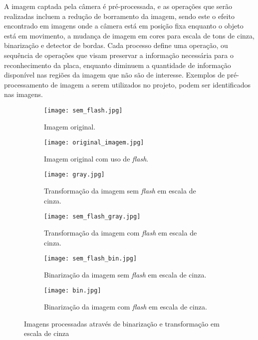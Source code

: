 A imagem captada pela câmera é pré-processada, e as operações que serão realizadas incluem a redução de borramento da imagem, sendo este o efeito encontrado em imagens onde a câmera está em posição fixa enquanto o objeto está em movimento, a mudança de imagem em cores para escala de tons de cinza, binarização e detector de bordas. Cada processo define uma operação, ou sequência de operações que visam preservar a informação necessária para o reconhecimento da placa, enquanto diminuem a quantidade de informação disponível nas regiões da imagem que não são de interesse.
Exemplos de pré-processamento de imagem a serem utilizados no projeto, podem ser identificados nas imagens.

\begin{figure}
    \centering
     \begin{subfigure}{0.45\textwidth}
        \texttt{[image: sem\_flash.jpg]}
        \caption{Imagem original.}
          \label{imagens_processadas:a}
      \end{subfigure}
        \hfill
      \begin{subfigure}{0.45\textwidth}
        \texttt{[image: original\_imagem.jpg]}
        \caption{Imagem original com uso de \emph{flash}.}
          \label{imagens_processadas:b}
      \end{subfigure}
      \hfill
      \begin{subfigure}{0.45\textwidth}
        \texttt{[image: gray.jpg]}
        \caption{Transformação da imagem sem \emph{flash} em escala de cinza.}
          \label{imagens_processadas:c}
      \end{subfigure}
      \hfill
      \begin{subfigure}{0.45\textwidth}
        \texttt{[image: sem\_flash\_gray.jpg]}
        \caption{Transformação da imagem com \emph{flash} em escala de cinza.}
          \label{imagens_processadas:d}
      \end{subfigure}
      \hfill
      \begin{subfigure}{0.45\textwidth}
        \texttt{[image: sem\_flash\_bin.jpg]}
        \caption{Binarização da imagem sem \emph{flash} em escala de cinza.}
          \label{imagens_processadas:e}
      \end{subfigure}
      \hfill
      \begin{subfigure}{0.45\textwidth}
        \texttt{[image: bin.jpg]}
        \caption{Binarização da imagem com \emph{flash} em escala de cinza.}
          \label{imagens_processadas:f}
      \end{subfigure}
  
    \label{imagens_processadas}
    \caption{Imagens processadas através de binarização e transformação em escala de cinza}
\end{figure}



